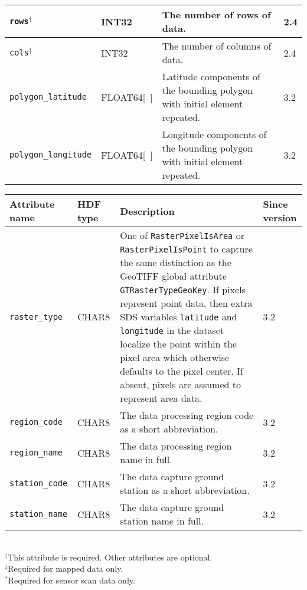 \begin{tabular}{|l|l|p{7.5cm}|l|}
  {\tt rows}$^{\dagger}$ & INT32 & The number of rows of data. & 2.4
  \\ \hline

  {\tt cols}$^{\dagger}$ & INT32 & The number of columns of data. &
  2.4 \\ \hline

  {\tt polygon\_latitude} & FLOAT64[~] & Latitude components of the
  bounding polygon with initial element repeated. & 3.2 \\ \hline 

  {\tt polygon\_longitude} & FLOAT64[~] & Longitude components of the
  bounding polygon with initial element repeated. & 3.2 \\ \hline

\end{tabular}

\begin{tabular}{|l|l|p{7.5cm}|l|}

  \hline

  Attribute name & HDF type & Description & Since version \\ \hline

  {\tt raster\_type} & CHAR8 & One of {\tt RasterPixelIsArea} or {\tt
  RasterPixelIsPoint} to capture the same distinction as the GeoTIFF
  global attribute {\tt GTRasterTypeGeoKey}. If pixels represent point
  data, then extra SDS variables {\tt latitude} and {\tt longitude} in
  the dataset localize the point within the pixel area which otherwise
  defaults to the pixel center. If absent, pixels are assumed to
  represent area data. & 3.2 \\ \hline

  {\tt region\_code} & CHAR8 & The data processing region code as a
  short abbreviation. & 3.2 \\ \hline

  {\tt region\_name} & CHAR8 & The data processing region name in
  full. & 3.2 \\ \hline

  {\tt station\_code} & CHAR8 & The data capture ground station as a
  short abbreviation. & 3.2 \\ \hline

  {\tt station\_name} & CHAR8 & The data capture ground station name
  in full. & 3.2 \\ \hline

\end{tabular} \\
$^{\dagger}$This attribute is required. Other attributes are
optional.\\
$^{\ddagger}$Required for mapped data only.\\ 
$^{\ast}$Required for sensor scan data only.

